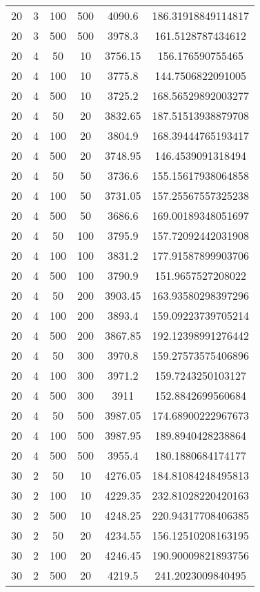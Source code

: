 {\begin{longtabu}{S
S
S
S
S[round-mode=places, round-precision=0]
S[round-mode=places, round-precision=0]}
20 & 3 & 100 & 500 & 4090.6 & 186.31918849114817 \\
20 & 3 & 500 & 500 & 3978.3 & 161.5128787434612 \\
20 & 4 & 50 & 10 & 3756.15 & 156.176590755465 \\
20 & 4 & 100 & 10 & 3775.8 & 144.7506822091005 \\
20 & 4 & 500 & 10 & 3725.2 & 168.56529892003277 \\
20 & 4 & 50 & 20 & 3832.65 & 187.51513938879708 \\
20 & 4 & 100 & 20 & 3804.9 & 168.39444765193417 \\
20 & 4 & 500 & 20 & 3748.95 & 146.4539091318494 \\
20 & 4 & 50 & 50 & 3736.6 & 155.15617938064858 \\
20 & 4 & 100 & 50 & 3731.05 & 157.25567557325238 \\
20 & 4 & 500 & 50 & 3686.6 & 169.00189348051697 \\
20 & 4 & 50 & 100 & 3795.9 & 157.72092442031908 \\
20 & 4 & 100 & 100 & 3831.2 & 177.91587899903706 \\
20 & 4 & 500 & 100 & 3790.9 & 151.9657527208022 \\
20 & 4 & 50 & 200 & 3903.45 & 163.93580298397296 \\
20 & 4 & 100 & 200 & 3893.4 & 159.09223739705214 \\
20 & 4 & 500 & 200 & 3867.85 & 192.12398991276442 \\
20 & 4 & 50 & 300 & 3970.8 & 159.27573575406896 \\
20 & 4 & 100 & 300 & 3971.2 & 159.7243250103127 \\
20 & 4 & 500 & 300 & 3911 & 152.8842699560684 \\
20 & 4 & 50 & 500 & 3987.05 & 174.68900222967673 \\
20 & 4 & 100 & 500 & 3987.95 & 189.8940428238864 \\
20 & 4 & 500 & 500 & 3955.4 & 180.1880684174177 \\
30 & 2 & 50 & 10 & 4276.05 & 184.81084248495813 \\
30 & 2 & 100 & 10 & 4229.35 & 232.81028220420163 \\
30 & 2 & 500 & 10 & 4248.25 & 220.94317708406385 \\
30 & 2 & 50 & 20 & 4234.55 & 156.12510208163195 \\
30 & 2 & 100 & 20 & 4246.45 & 190.90009821893756 \\
30 & 2 & 500 & 20 & 4219.5 & 241.2023009840495 \\

\end{longtabu}}

